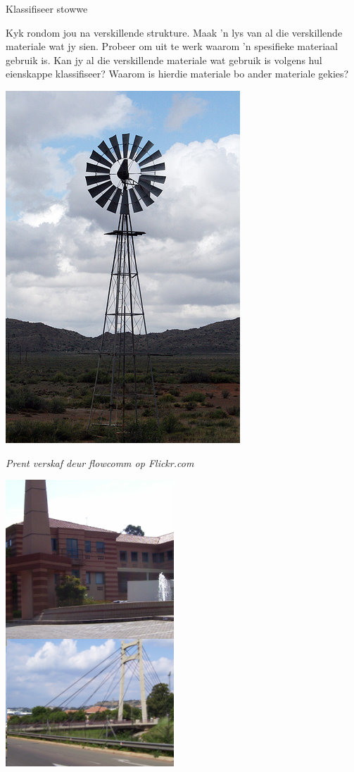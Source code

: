 \begin{activity}{Klassifiseer stowwe} {
\begin{minipage}{.4\textwidth}
Kyk rondom jou na verskillende strukture. Maak 'n lys van al die verskillende materiale wat jy sien. Probeer om uit te werk waarom 'n spesifieke materiaal gebruik is. Kan jy al die verskillende materiale wat gebruik is volgens hul eienskappe klassifiseer? Waarom is hierdie materiale bo ander materiale gekies?
\end{minipage}
\begin{minipage}{.3\textwidth}
\begin{center}
 \includegraphics[height=.7\textwidth]{photos/windmillby-flowcomm-flickr.jpg}\par
\textit{Prent verskaf deur flowcomm op Flickr.com}
\end{center}
\end{minipage}
\begin{minipage}{.3\textwidth}
\begin{center}
 \includegraphics[height=.7\textwidth]{photos/materials.png}\par
\end{center}
\end{minipage}
}
\end{activity}


